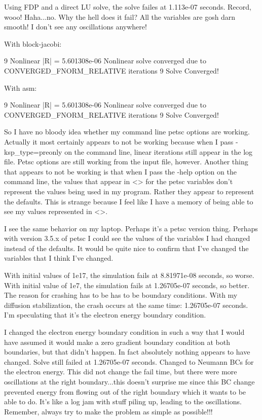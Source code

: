 Using FDP and a direct LU solve, the solve failes at 1.113e-07 seconds. Record, wooo! Haha...no. Why the hell does it fail? All the variables are gosh darn smooth! I don't see any oscillations anywhere!

With block-jacobi:

 9 Nonlinear |R| = 5.601308e-06
Nonlinear solve converged due to CONVERGED_FNORM_RELATIVE iterations 9
 Solve Converged!

With asm:

 9 Nonlinear |R| = 5.601308e-06
Nonlinear solve converged due to CONVERGED_FNORM_RELATIVE iterations 9
 Solve Converged!

So I have no bloody idea whether my command line petsc options are working. Actually it most certainly appears to not be working because when I pass -ksp_type=preonly on the command line, linear iterations still appear in the log file. Petsc options are still working from the input file, however. Another thing that appears to not be working is that when I pass the -help option on the command line, the values that appear in <> for the petsc variables don't represent the values being used in my program. Rather they appear to represent the defaults. This is strange because I feel like I have a memory of being able to see my values represented in <>.

I see the same behavior on my laptop. Perhaps it's a petsc version thing. Perhaps with version 3.5.x of petsc I could see the values of the variables I had changed instead of the defaults. It would be quite nice to confirm that I've changed the variables that I think I've changed.

With initial values of 1e17, the simulation fails at 8.81971e-08 seconds, so worse. With initial value of 1e7, the simulation fails at 1.26705e-07 seconds, so better. The reason for crashing has to be has to be boundary conditions. With my diffusion stabilization, the crash occurs at the same time: 1.26705e-07 seconds. I'm speculating that it's the electron energy boundary condition.

I changed the electron energy boundary condition in such a way that I would have assumed it would make a zero gradient boundary condition at both boundaries, but that didn't happen. In fact absolutely nothing appears to have changed. Solve still failed at 1.26705e-07 seconds. Changed to Neumann BCs for the electron energy. This did not change the fail time, but there were more oscillations at the right boundary...this doesn't surprise me since this BC change prevented energy from flowing out of the right boundary which it wants to be able to do. It's like a log jam with stuff piling up, leading to the oscillations. Remember, always try to make the problem as simple as possible!!!

